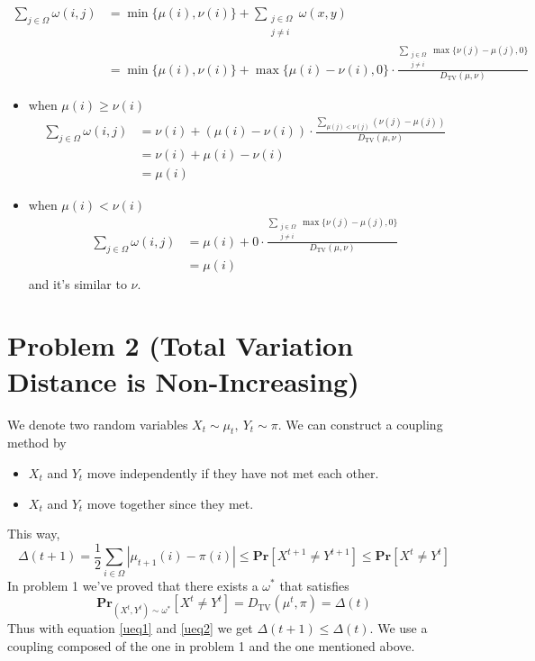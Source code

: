 \documentclass{article}
\theoremstyle{definition}
\begin{document}
	$$
	\begin{aligned}
		\sum_{j \in \Omega} \omega(i, j) & =\min \{\mu(i), \nu(i)\}+\sum_{\substack{j \in \Omega \\
				j \neq i}} \omega(x, y) \\
		& =\min \{\mu(i), \nu(i)\}+\max \{\mu(i)-\nu(i), 0\} \cdot \frac{\underset{\substack{j \in \Omega \\
					j \neq i}}{\sum} \max \{\nu(j)-\mu(j), 0\}}{D_{\operatorname{TV}}(\mu, \nu)} 
	\end{aligned}
	$$
	\begin{itemize}
		\item when $\mu(i)\geq\nu(i)$
		$$
		\begin{aligned}
			\sum_{j \in \Omega} \omega(i, j) & =\nu(i)+(\mu(i)-\nu(i)) \cdot \frac{\underset{\mu(j)<\nu(j)}{\sum}(\nu(j)-\mu(j))}{D_{\operatorname{TV}}(\mu, \nu)} \\
			& =\nu(i)+\mu(i)-\nu(i) \\
			& =\mu(i)
		\end{aligned}
		$$
		\item when $\mu(i)<\nu(i)$
		$$
		\begin{aligned}
			\sum_{j \in \Omega} \omega(i, j) & =\mu(i)+ 0 \cdot \frac{\underset{\substack{j \in \Omega \\
						j \neq i}}{\sum} \max \{\nu(j)-\mu(j), 0\}}{D_{\operatorname{TV}}(\mu, \nu)} \\
			& =\mu(i)
		\end{aligned}
		$$
		and it's similar to $\nu$.
	\end{itemize}
	
	\section*{Problem 2 (Total Variation Distance is Non-Increasing)}
	We denote two random variables $X_t\sim \mu_t, ~Y_t\sim \pi$. We can construct a coupling method by 
	\begin{itemize}
		\item $X_t$ and $Y_t$ move independently if they have not met each other.
		\item $X_t$ and $Y_t$ move together since they met.
	\end{itemize}
	This way, 
	\begin{equation}
		\Delta(t+1) = \frac{1}{2}\underset{i \in \Omega}{\sum}|\mu_{t+1}(i)-\pi(i)|\leq \mathbf{Pr}[X^{t+1}\neq Y^{t+1}]\leq \mathbf{Pr}[X^{t}\neq Y^{t}]
		\label{ueq1}
	\end{equation}
	In problem 1 we've proved that there exists a $\omega^*$ that satisfies 
	\begin{equation}
		\mathbf{Pr}_{(X^t,Y^t)\sim\omega^*}[X^t\neq Y^t] = D_{\operatorname{TV}}(\mu^t, \pi) = \Delta(t)
		\label{ueq2}
	\end{equation}
	Thus with equation \ref{ueq1} and \ref{ueq2} we get $\Delta(t+1)\leq\Delta(t)$. We use a coupling composed of the one in problem 1 and the one mentioned above. 
	
\end{document}
